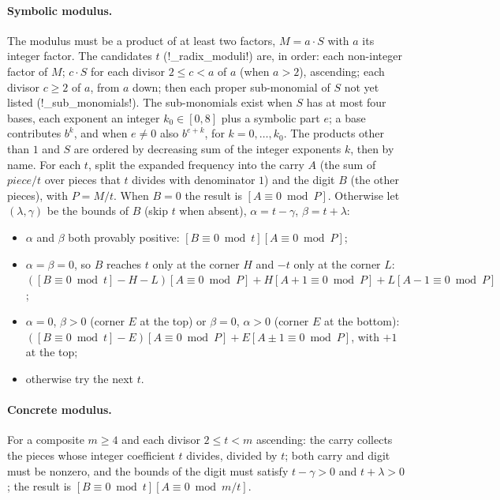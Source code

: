 \paragraph{Symbolic modulus.} The modulus must be a product of at least two factors, $M=a\cdot S$ with $a$ its integer factor. The candidates $t$ (\py!_radix_moduli!) are, in order: each non-integer factor of $M$; $c\cdot S$ for each divisor $2\le c<a$ of $a$ (when $a>2$), ascending; each divisor $c\ge 2$ of $a$, from $a$ down; then each proper sub-monomial of $S$ not yet listed (\py!_sub_monomials!). The sub-monomials exist when $S$ has at most four bases, each exponent an integer $k_0\in[0,8]$ plus a symbolic part $e$; a base contributes $b^k$, and when $e\ne0$ also $b^{e+k}$, for $k=0,\ldots,k_0$. The products other than $1$ and $S$ are ordered by decreasing sum of the integer exponents $k$, then by name. For each $t$, split the expanded frequency into the carry $A$ (the sum of $\mathit{piece}/t$ over pieces that $t$ divides with denominator $1$) and the digit $B$ (the other pieces), with $P=M/t$. When $B=0$ the result is $[A\equiv 0\bmod P]$. Otherwise let $(\lambda,\gamma)$ be the bounds of $B$ (skip $t$ when absent), $\alpha=t-\gamma$, $\beta=t+\lambda$:
\begin{itemize}
\item $\alpha$ and $\beta$ both provably positive: $[B\equiv0\bmod t][A\equiv0\bmod P]$;
\item $\alpha=\beta=0$, so $B$ reaches $t$ only at the corner $H$ and $-t$ only at the corner $L$: $([B\equiv0\bmod t]-H-L)[A\equiv0\bmod P]+H[A+1\equiv0\bmod P]+L[A-1\equiv0\bmod P]$;
\item $\alpha=0$, $\beta>0$ (corner $E$ at the top) or $\beta=0$, $\alpha>0$ (corner $E$ at the bottom): $([B\equiv0\bmod t]-E)[A\equiv0\bmod P]+E[A\pm1\equiv0\bmod P]$, with $+1$ at the top;
\item otherwise try the next $t$.
\end{itemize}

\paragraph{Concrete modulus.} For a composite $m\ge 4$ and each divisor $2\le t<m$ ascending: the carry collects the pieces whose integer coefficient $t$ divides, divided by $t$; both carry and digit must be nonzero, and the bounds of the digit must satisfy $t-\gamma>0$ and $t+\lambda>0$; the result is $[B\equiv0\bmod t][A\equiv0\bmod m/t]$.

